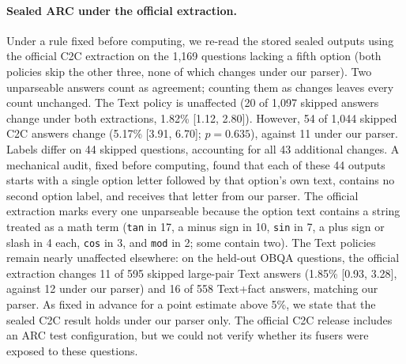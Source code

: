\paragraph{Sealed ARC under the official extraction.} Under a rule fixed before computing, we re-read the stored sealed outputs using the official C2C extraction on the 1,169 questions lacking a fifth option (both policies skip the other three, none of which changes under our parser). Two unparseable answers count as agreement; counting them as changes leaves every count unchanged. The Text policy is unaffected (20 of 1,097 skipped answers change under both extractions, 1.82\% [1.12, 2.80]). However, 54 of 1,044 skipped C2C answers change (5.17\% [3.91, 6.70]; $p=0.635$), against 11 under our parser. Labels differ on 44 skipped questions, accounting for all 43 additional changes. A mechanical audit, fixed before computing, found that each of these 44 outputs starts with a single option letter followed by that option's own text, contains no second option label, and receives that letter from our parser. The official extraction marks every one unparseable because the option text contains a string treated as a math term (\texttt{tan} in 17, a minus sign in 10, \texttt{sin} in 7, a plus sign or slash in 4 each, \texttt{cos} in 3, and \texttt{mod} in 2; some contain two). The Text policies remain nearly unaffected elsewhere: on the held-out OBQA questions, the official extraction changes 11 of 595 skipped large-pair Text answers (1.85\% [0.93, 3.28], against 12 under our parser) and 16 of 558 Text+fact answers, matching our parser. As fixed in advance for a point estimate above 5\%, we state that the sealed C2C result holds under our parser only. The official C2C release includes an ARC test configuration, but we could not verify whether its fusers were exposed to these questions.

